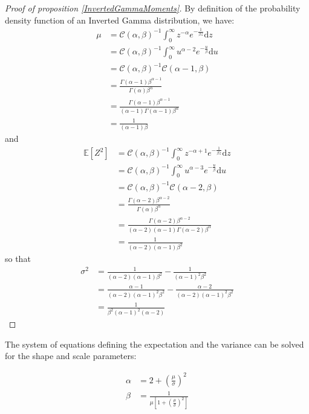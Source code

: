 \documentclass{amsart}
\theoremstyle{plain}
\theoremstyle{remark}
\numberwithin{equation}{section}
\begin{document}
\begin{proof}[Proof of proposition \ref{InvertedGammaMoments}]
  By definition of the probability density function of an Inverted Gamma distribution, we have:
  \[
    \begin{split}
      \mu &= \mathcal C(\alpha, \beta)^{-1} \int_0^{\infty}z^{-\alpha}e^{-\frac{1}{\beta z}}\mathrm dz\\
      &= \mathcal C(\alpha, \beta)^{-1} \int_0^{\infty}u^{\alpha-2}e^{-\frac{u}{\beta}}\mathrm du\\
      &= \mathcal C(\alpha, \beta)^{-1} \mathcal C(\alpha-1, \beta)\\
      &= \frac{\Gamma(\alpha-1)\beta^{\alpha-1}}{\Gamma(\alpha)\beta^{\alpha}}\\
      &= \frac{\Gamma(\alpha-1)\beta^{\alpha-1}}{(\alpha-1)\Gamma(\alpha-1)\beta^{\alpha}}\\
      &= \frac{1}{(\alpha-1)\beta}
    \end{split}
  \]
  and
  \[
    \begin{split}
      \mathbb E[Z^2] &= \mathcal C(\alpha, \beta)^{-1} \int_0^{\infty}z^{-\alpha+1}e^{-\frac{1}{\beta z}}\mathrm dz\\
      &= \mathcal C(\alpha, \beta)^{-1} \int_0^{\infty}u^{\alpha-3}e^{-\frac{u}{\beta}}\mathrm du\\
      &= \mathcal C(\alpha, \beta)^{-1} \mathcal C(\alpha-2, \beta)\\
      &= \frac{\Gamma(\alpha-2)\beta^{\alpha-2}}{\Gamma(\alpha)\beta^{\alpha}}\\
      &= \frac{\Gamma(\alpha-2)\beta^{\alpha-2}}{(\alpha-2)(\alpha-1)\Gamma(\alpha-2)\beta^{\alpha}}\\
      &= \frac{1}{(\alpha-2)(\alpha-1)\beta^2}
    \end{split}
  \]
  so that
  \[
    \begin{split}
      \sigma^2 &= \frac{1}{(\alpha-2)(\alpha-1)\beta^2} - \frac{1}{(\alpha-1)^2\beta^2}\\
      &= \frac{\alpha-1}{(\alpha-2)(\alpha-1)^2\beta^2} - \frac{\alpha-2}{(\alpha-2)(\alpha-1)^2\beta^2}\\
      &= \frac{1}{\beta^2(\alpha-1)^2(\alpha-2)}
    \end{split}
  \]
\end{proof}

The system of equations defining the expectation and the variance can be solved
for the shape and scale parameters:

\begin{equation}
  \begin{split}
    \alpha &= 2 + \left(\frac{\mu}{\sigma}\right)^2\\
    \beta &= \frac{1}{\mu \left[1+\left(\frac{\mu}{\sigma}\right)^2\right]}
  \end{split}
\end{equation}
\end{document}

